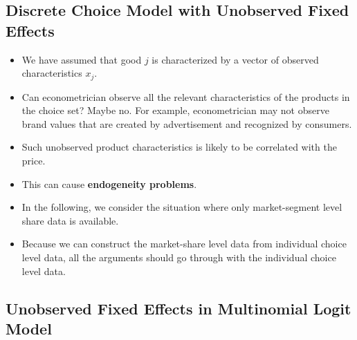 \documentclass[
]{book}
\providecommand{\tightlist}{%
  \setlength{\itemsep}{0pt}\setlength{\parskip}{0pt}}
\begin{document}
\hypertarget{discrete-choice-model-with-unobserved-fixed-effects}{%
\subsection{Discrete Choice Model with Unobserved Fixed Effects}\label{discrete-choice-model-with-unobserved-fixed-effects}}

\begin{itemize}
\tightlist
\item
  We have assumed that good \(j\) is characterized by a vector of observed characteristics \(x_j\).
\item
  Can econometrician observe all the relevant characteristics of the products in the choice set? Maybe no. For example, econometrician may not observe brand values that are created by advertisement and recognized by consumers.
\item
  Such unobserved product characteristics is likely to be correlated with the price.
\item
  This can cause \textbf{endogeneity problems}.
\item
  In the following, we consider the situation where only market-segment level share data is available.
\item
  Because we can construct the market-share level data from individual choice level data, all the arguments should go through with the individual choice level data.
\end{itemize}

\hypertarget{unobserved-fixed-effects-in-multinomial-logit-model}{%
\subsection{Unobserved Fixed Effects in Multinomial Logit Model}\label{unobserved-fixed-effects-in-multinomial-logit-model}}
\end{document}
